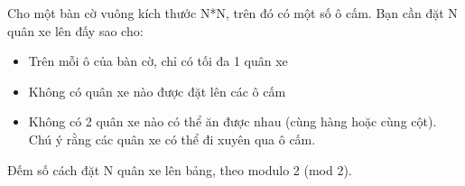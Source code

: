 Cho một bàn cờ vuông kích thước N*N, trên đó có một số ô cấm. Bạn cần đặt N quân xe lên đấy sao cho:  
\begin{itemize}
	\item     Trên mỗi ô của bàn cờ, chỉ có tối đa 1 quân xe   
	\item     Không có quân xe nào được đặt lên các ô cấm   
	\item     Không có 2 quân xe nào có thể ăn được nhau (cùng hàng hoặc cùng cột). Chú ý rằng các quân xe có thể đi xuyên qua ô cấm.   
\end{itemize}

   Đếm số cách đặt N quân xe lên bảng, theo modulo 2 (mod 2).